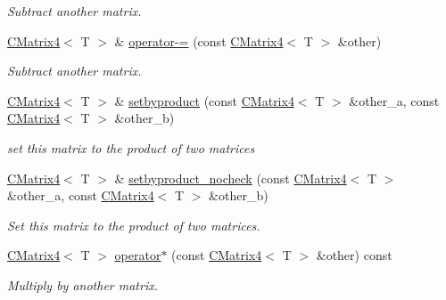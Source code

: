 \begin{DoxyCompactItemize}
\begin{DoxyCompactList}\small\item\em Subtract another matrix. \end{DoxyCompactList}\item 
\hyperlink{classirr_1_1core_1_1CMatrix4}{C\+Matrix4}$<$ T $>$ \& \hyperlink{classirr_1_1core_1_1CMatrix4_a24eb7faa1418765ba87d3f02f27d643f}{operator-\/=} (const \hyperlink{classirr_1_1core_1_1CMatrix4}{C\+Matrix4}$<$ T $>$ \&other)\hypertarget{classirr_1_1core_1_1CMatrix4_a24eb7faa1418765ba87d3f02f27d643f}{}\label{classirr_1_1core_1_1CMatrix4_a24eb7faa1418765ba87d3f02f27d643f}

\begin{DoxyCompactList}\small\item\em Subtract another matrix. \end{DoxyCompactList}\item 
\hyperlink{classirr_1_1core_1_1CMatrix4}{C\+Matrix4}$<$ T $>$ \& \hyperlink{classirr_1_1core_1_1CMatrix4_a8503c58913ba9407ba00b173d8a3e25c}{setbyproduct} (const \hyperlink{classirr_1_1core_1_1CMatrix4}{C\+Matrix4}$<$ T $>$ \&other\+\_\+a, const \hyperlink{classirr_1_1core_1_1CMatrix4}{C\+Matrix4}$<$ T $>$ \&other\+\_\+b)
\begin{DoxyCompactList}\small\item\em set this matrix to the product of two matrices \end{DoxyCompactList}\item 
\hyperlink{classirr_1_1core_1_1CMatrix4}{C\+Matrix4}$<$ T $>$ \& \hyperlink{classirr_1_1core_1_1CMatrix4_a526a2a11dcd8b18c9e77deb84094778d}{setbyproduct\+\_\+nocheck} (const \hyperlink{classirr_1_1core_1_1CMatrix4}{C\+Matrix4}$<$ T $>$ \&other\+\_\+a, const \hyperlink{classirr_1_1core_1_1CMatrix4}{C\+Matrix4}$<$ T $>$ \&other\+\_\+b)
\begin{DoxyCompactList}\small\item\em Set this matrix to the product of two matrices. \end{DoxyCompactList}\item 
\hyperlink{classirr_1_1core_1_1CMatrix4}{C\+Matrix4}$<$ T $>$ \hyperlink{classirr_1_1core_1_1CMatrix4_a4173ab9beecf99940ba2eb01081f1613}{operator$\ast$} (const \hyperlink{classirr_1_1core_1_1CMatrix4}{C\+Matrix4}$<$ T $>$ \&other) const 
\begin{DoxyCompactList}\small\item\em Multiply by another matrix. \end{DoxyCompactList}\item 

\end{DoxyCompactItemize}
